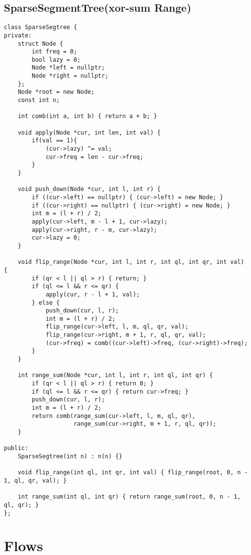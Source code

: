\subsection{SparseSegmentTree(xor-sum Range)}

\begin{lstlisting}[style=cpp]
class SparseSegtree {
private:
    struct Node {
        int freq = 0;
        bool lazy = 0;
        Node *left = nullptr;
        Node *right = nullptr;
    };
    Node *root = new Node;
    const int n;

    int comb(int a, int b) { return a + b; }

    void apply(Node *cur, int len, int val) {
        if(val == 1){
            (cur->lazy) ^= val;
            cur->freq = len - cur->freq;
        }
    }

    void push_down(Node *cur, int l, int r) {
        if ((cur->left) == nullptr) { (cur->left) = new Node; }
        if ((cur->right) == nullptr) { (cur->right) = new Node; }
        int m = (l + r) / 2;
        apply(cur->left, m - l + 1, cur->lazy);
        apply(cur->right, r - m, cur->lazy);
        cur->lazy = 0;
    }

    void flip_range(Node *cur, int l, int r, int ql, int qr, int val) {
        if (qr < l || ql > r) { return; }
        if (ql <= l && r <= qr) {
            apply(cur, r - l + 1, val);
        } else {
            push_down(cur, l, r);
            int m = (l + r) / 2;
            flip_range(cur->left, l, m, ql, qr, val);
            flip_range(cur->right, m + 1, r, ql, qr, val);
            (cur->freq) = comb((cur->left)->freq, (cur->right)->freq);
        }
    }

    int range_sum(Node *cur, int l, int r, int ql, int qr) {
        if (qr < l || ql > r) { return 0; }
        if (ql <= l && r <= qr) { return cur->freq; }
        push_down(cur, l, r);
        int m = (l + r) / 2;
        return comb(range_sum(cur->left, l, m, ql, qr),
                    range_sum(cur->right, m + 1, r, ql, qr));
    }

public:
    SparseSegtree(int n) : n(n) {}

    void flip_range(int ql, int qr, int val) { flip_range(root, 0, n - 1, ql, qr, val); }

    int range_sum(int ql, int qr) { return range_sum(root, 0, n - 1, ql, qr); }
};
\end{lstlisting}

\section{Flows}

